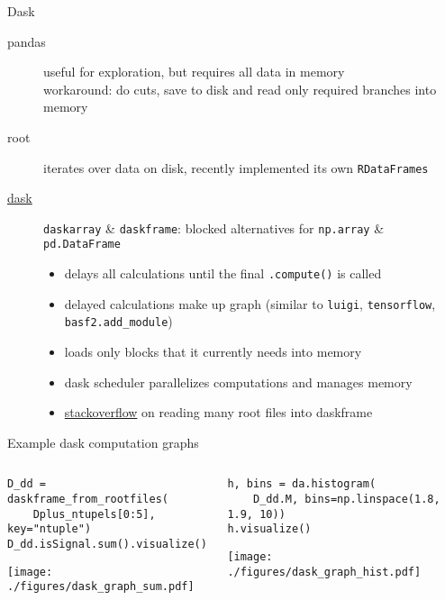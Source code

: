 \documentclass[aspectratio=169, 16pt]{beamer}
\begin{document}
\begin{frame}[label={sec:org3365595},fragile]{Dask}
 \begin{description}
\item[{pandas}] useful for exploration, but requires all data in memory\\
workaround: do cuts, save to disk and read only required branches into memory
\item[{root}] iterates over data on disk, recently implemented its own \texttt{RDataFrames}
\item[{\href{https://dask.org/}{dask}}] \texttt{daskarray} \& \texttt{daskframe}: \alert{blocked} alternatives for \texttt{np.array} \& \texttt{pd.DataFrame}
\begin{itemize}
\item delays all calculations until the final \texttt{.compute()} is called
\item delayed calculations make up graph (similar to \texttt{luigi}, \texttt{tensorflow}, \texttt{basf2.add\_module})
\item loads only blocks that it currently needs into memory
\item dask scheduler parallelizes computations and manages memory
\item \href{https://stackoverflow.com/questions/60189433/how-to-avoid-too-many-open-files-error-when-using-uproot-daskframes-to-create/60191127\#60191127}{stackoverflow} on reading many root files into daskframe
\end{itemize}
\end{description}
\end{frame}

\begin{frame}[label={sec:org5b4ee6c},fragile]{Example dask computation graphs}
 \begin{columns}
\begin{column}{0.5\columnwidth}
\lstset{language=Python,label= ,caption= ,captionpos=b,numbers=none,basicstyle=\tiny\ttfamily, xleftmargin=-5pt}
\begin{lstlisting}
D_dd = daskframe_from_rootfiles(
    Dplus_ntupels[0:5], key="ntuple")
D_dd.isSignal.sum().visualize()
\end{lstlisting}
\begin{center}
\texttt{[image: ./figures/dask\_graph\_sum.pdf]}
\end{center}
\end{column}
\begin{column}{0.5\columnwidth}
\lstset{language=Python,label= ,caption= ,captionpos=b,numbers=none,basicstyle=\tiny\ttfamily, xleftmargin=-5pt}
\begin{lstlisting}
h, bins = da.histogram(
    D_dd.M, bins=np.linspace(1.8, 1.9, 10))
h.visualize()
\end{lstlisting}
\begin{center}
\texttt{[image: ./figures/dask\_graph\_hist.pdf]}
\end{center}
\end{column}
\end{columns}
\end{frame}
\end{document}
